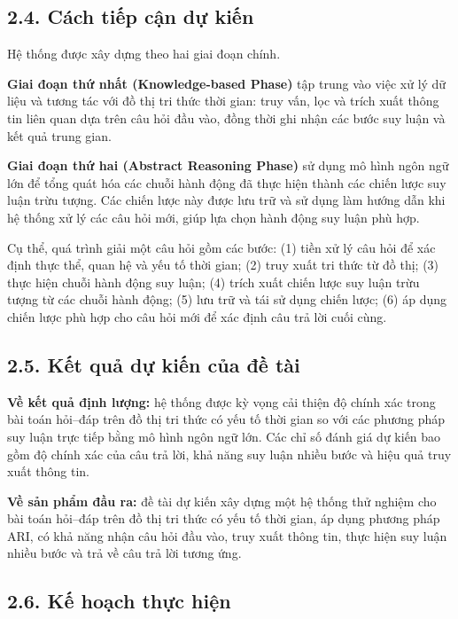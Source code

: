 \subsection*{2.4. Cách tiếp cận dự kiến}

Hệ thống được xây dựng theo hai giai đoạn chính.

\textbf{Giai đoạn thứ nhất (Knowledge-based Phase)} tập trung vào việc xử lý dữ liệu và tương tác
với đồ thị tri thức thời gian: truy vấn, lọc và trích xuất thông tin liên quan dựa trên câu hỏi đầu
vào, đồng thời ghi nhận các bước suy luận và kết quả trung gian.

\textbf{Giai đoạn thứ hai (Abstract Reasoning Phase)} sử dụng mô hình ngôn ngữ lớn để tổng quát hóa
các chuỗi hành động đã thực hiện thành các chiến lược suy luận trừu tượng. Các chiến lược này được
lưu trữ và sử dụng làm hướng dẫn khi hệ thống xử lý các câu hỏi mới, giúp lựa chọn hành động suy
luận phù hợp.

Cụ thể, quá trình giải một câu hỏi gồm các bước: (1) tiền xử lý câu hỏi để xác định thực thể, quan
hệ và yếu tố thời gian; (2) truy xuất tri thức từ đồ thị; (3) thực hiện chuỗi hành động suy luận;
(4) trích xuất chiến lược suy luận trừu tượng từ các chuỗi hành động; (5) lưu trữ và tái sử dụng
chiến lược; (6) áp dụng chiến lược phù hợp cho câu hỏi mới để xác định câu trả lời cuối cùng.

\subsection*{2.5. Kết quả dự kiến của đề tài}

\textbf{Về kết quả định lượng:} hệ thống được kỳ vọng cải thiện độ chính xác trong bài toán hỏi--đáp
trên đồ thị tri thức có yếu tố thời gian so với các phương pháp suy luận trực tiếp bằng mô hình ngôn
ngữ lớn. Các chỉ số đánh giá dự kiến bao gồm độ chính xác của câu trả lời, khả năng suy luận nhiều
bước và hiệu quả truy xuất thông tin.

\textbf{Về sản phẩm đầu ra:} đề tài dự kiến xây dựng một hệ thống thử nghiệm cho bài toán hỏi--đáp
trên đồ thị tri thức có yếu tố thời gian, áp dụng phương pháp ARI, có khả năng nhận câu hỏi đầu vào,
truy xuất thông tin, thực hiện suy luận nhiều bước và trả về câu trả lời tương ứng.

\subsection*{2.6. Kế hoạch thực hiện}

